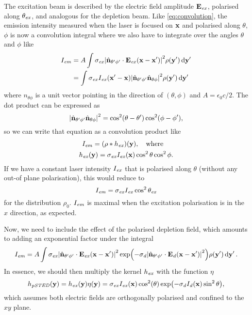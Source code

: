 The excitation beam is described by the electric field amplitude $ \vb{E}_{\mathit{ex}} $, polarised along $ \theta_{\mathit{ex}} $, and analogous for the depletion beam. Like \autoref{eq:convolution}, the emission intensity measured when the laser is focused on $ \vb{x} $ and polarised along $ \theta $, $ \phi $ is now a convolution integral where we also have to integrate over the angles $ \theta $ and $ \phi $ like
\begin{equation}
	\begin{aligned}
		I_{\mathit{em}} 
			&= A \int 
				\sigma_{\mathit{ex}} \abs{\hat{\vb{n}}_{\theta'\phi'} \cdot \vb{E}_{\mathit{ex}}(\vb{x}-\vb{x}')}^2 
				\rho(\vb{y}') 
				\dd{\vb{y}'} \\
			&= \int 
				\sigma_{\mathit{ex}} I_{\mathit{ex}}(\vb{x}'-\vb{x}) \abs{\hat{\vb{n}}_{\theta'\phi'}\hat{\vb{n}}_{\theta\phi}}^2
				\rho(\vb{y}') 
				\dd{\vb{y}'}
	\end{aligned}
\end{equation}
where $ \unit{n}_{\theta\phi} $ is a unit vector pointing in the direction of $ (\theta, \phi) $ and $ A = \epsilon_0c/2 $. The dot product can be expressed as
\begin{equation}
	\abs{\hat{\vb{n}}_{\theta'\phi'}\hat{\vb{n}}_{\theta\phi}}^2 = \cos^2(\theta-\theta') \cos^2(\phi-\phi'),
\end{equation}
so we can write that equation as a convolution product like
\begin{gather}
	I_\emm = (\rho*h_\exc)(\vb{y}),\qq{where} \\
	h_\exc(\vb{y}) = \sigma_\exc I_\exc(\vb{x}) \cos^2\theta\cos^2\phi.
\end{gather}
If we have a constant laser intensity $ I_{\mathit{ex}} $ that is polarised along $ \theta $ (without any out-of plane polarisation), this would reduce to
\begin{equation}
	I_{\mathit{em}} = \sigma_{\mathit{ex}} I_{\mathit{ex}} \cos^2\theta_{\mathit{ex}}
\end{equation}
for the distribution $ \rho_0 $. $ I_{\mathit{em}} $ is maximal when the excitation polarisation is in the $ x $ direction, as expected.

Now, we need to include the effect of the polarised depletion field, which amounts to adding an exponential factor under the integral
\begin{equation}
	I_{\mathit{em}} = A \int
		\sigma_{\mathit{ex}} \abs{\hat{\vb{n}}_{\theta'\phi'} \cdot \vb{E}_{\mathit{ex}}(\vb{x}-\vb{x}')}^2  
		\exp(-\sigma_{\mathit{d}} \abs{\hat{\vb{n}}_{\theta'\phi'} \cdot \vb{E}_{\mathit{d}}(\vb{x}-\vb{x}')}^2)
		\rho(\vb{y}') 
		\dd{\vb{y}'}.
	\label{eq:psted integral}
\end{equation}
In essence, we should then multiply the kernel $ h_{\mathit{ex}} $ with the function $ \eta $
\begin{equation}
	h_\mathit{pSTED}(\vb{y}) = h_{\mathit{ex}}(\vb{y}) \eta(\vb{y}) = \sigma_{\mathit{ex}} I_{\mathit{ex}}(\vb{x}) \cos^2(\theta) \exp(-\sigma_{\mathit{d}} I_{\mathit{d}}(\vb{x}) \sin^2 \theta),
\end{equation}
which assumes both electric fields are orthogonally polarised and confined to the $ xy $ plane.

